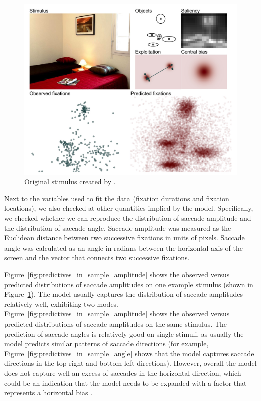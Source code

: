 \documentclass{article}
\begin{document}
\begin{figure}
    \centering
    \includegraphics[width=\textwidth]{figures/fit_model/in_sample/xy/1251.jpg}
    \caption{Original stimulus created by \citet{xu2014beyond}.}
    \label{fig:predictives_in_sample_xy}
\end{figure}

Next to the variables used to fit the data (fixation durations and fixation locations), we also checked at other quantities implied by the model. Specifically, we checked whether we can reproduce the distribution of saccade amplitude and the distribution of saccade angle.  Saccade amplitude was measured as the Euclidean distance between two successive fixations in units of pixels. Saccade angle was calculated as an angle in radians between the horizontal axis of the screen and the vector that connects two successive fixations.

Figure~\ref{fig:predictives_in_sample_amplitude} shows the observed versus predicted distributions of saccade amplitudes on one example stimulus (shown in Figure~\ref{fig:predictives_in_sample_xy}). The model usually captures the distribution of saccade amplitudes relatively well, exhibiting two modes. Figure~\ref{fig:predictives_in_sample_amplitude} shows the observed versus predicted distributions of saccade amplitudes on the same stimulus. The prediction of saccade angles is relatively good on single stimuli, as usually the model predicts similar patterns of saccade directions (for example, Figure~\ref{fig:predictives_in_sample_angle} shows that the model captures saccade directions in the top-right and bottom-left directions). However, overall the model does not capture well an excess of saccades in the horizontal direction, which could be an indication that the model needs to be expanded with a factor that represents a horizontal bias \citep{renswoude2016horizontal}.
\end{document}

